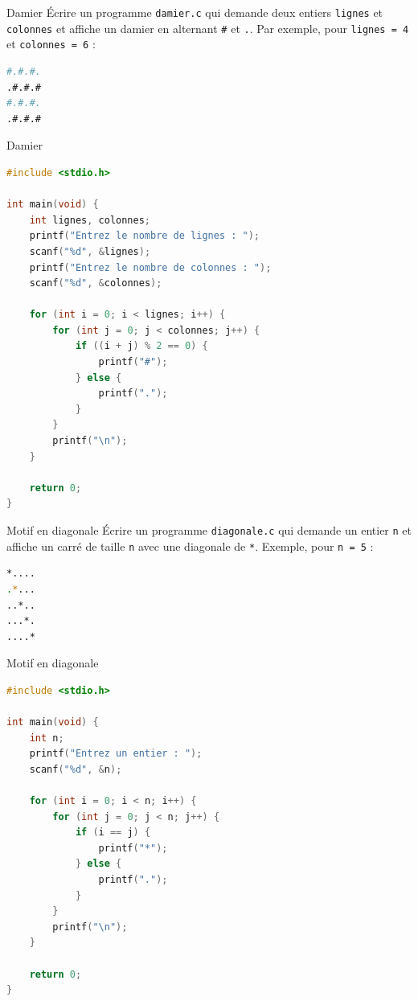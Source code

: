 \begin{UPSTIexercice}{Damier}
	\UPSTIetape Écrire un programme \texttt{damier.c} qui demande deux entiers \texttt{lignes} et \texttt{colonnes} et affiche un damier en alternant \texttt{\#} et \texttt{.}.
	Par exemple, pour \texttt{lignes = 4} et \texttt{colonnes = 6} :
	\begin{lstlisting}[language=bash,style=console]
#.#.#.
.#.#.#
#.#.#.
.#.#.#
\end{lstlisting}
\end{UPSTIexercice}

\begin{UPSTIcorrectionP}{Damier}
	\begin{lstlisting}[language=c]
#include <stdio.h>

int main(void) {
    int lignes, colonnes;
    printf("Entrez le nombre de lignes : ");
    scanf("%d", &lignes);
    printf("Entrez le nombre de colonnes : ");
    scanf("%d", &colonnes);

    for (int i = 0; i < lignes; i++) {
        for (int j = 0; j < colonnes; j++) {
            if ((i + j) % 2 == 0) {
                printf("#");
            } else {
                printf(".");
            }
        }
        printf("\n");
    }

    return 0;
}
	\end{lstlisting}
\end{UPSTIcorrectionP}

\begin{UPSTIexercice}{Motif en diagonale}
	\UPSTIetape Écrire un programme \texttt{diagonale.c} qui demande un entier \texttt{n} et affiche un carré de taille \texttt{n} avec une diagonale de \texttt{*}.
	Exemple, pour \texttt{n = 5} :
	\begin{lstlisting}[language=bash,style=console]
*....
.*...
..*..
...*.
....*
\end{lstlisting}
\end{UPSTIexercice}

\begin{UPSTIcorrectionP}{Motif en diagonale}
	\begin{lstlisting}[language=c]
#include <stdio.h>

int main(void) {
    int n;
    printf("Entrez un entier : ");
    scanf("%d", &n);

    for (int i = 0; i < n; i++) {
        for (int j = 0; j < n; j++) {
            if (i == j) {
                printf("*");
            } else {
                printf(".");
            }
        }
        printf("\n");
    }

    return 0;
}
	\end{lstlisting}
\end{UPSTIcorrectionP}

